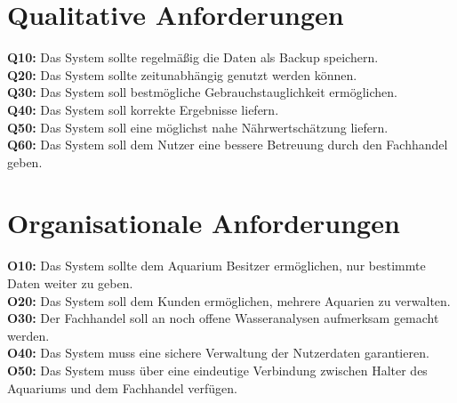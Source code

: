 \section{Qualitative Anforderungen}

	\textbf{Q10:} Das System sollte regelmäßig die Daten als Backup speichern.\\
	\textbf{Q20:} Das System sollte zeitunabhängig genutzt werden können.\\
	\textbf{Q30:} Das System soll bestmögliche Gebrauchstauglichkeit ermöglichen.\\
	\textbf{Q40:} Das System soll korrekte Ergebnisse liefern.\\
	\textbf{Q50: }Das System soll eine möglichst nahe Nährwertschätzung liefern.\\
	\textbf{Q60:} Das System soll dem Nutzer eine bessere Betreuung durch den Fachhandel geben.\\
	
	
\section{Organisationale Anforderungen}
	\textbf{O10:} Das System sollte dem Aquarium Besitzer ermöglichen, nur bestimmte Daten weiter zu geben.	\\
	\textbf{O20:} Das System soll dem Kunden ermöglichen, mehrere Aquarien zu verwalten.\\
	\textbf{O30: }Der Fachhandel soll an noch offene Wasseranalysen aufmerksam gemacht werden.\\
	\textbf{O40:} Das System muss eine sichere Verwaltung der Nutzerdaten garantieren.\\
	\textbf{O50:} Das System muss über eine eindeutige Verbindung zwischen Halter des Aquariums und dem Fachhandel verfügen.\\
